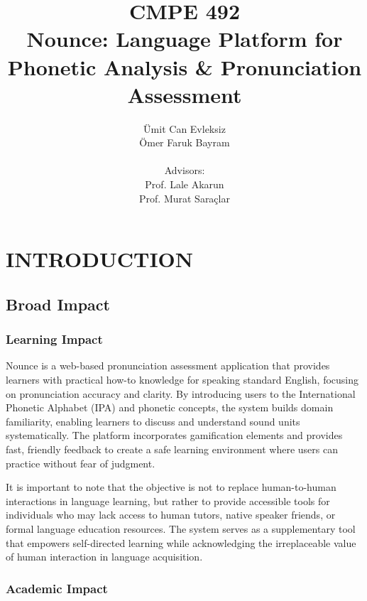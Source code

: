 \documentclass[a4paper,12pt]{report}
\begin{document}
\title{CMPE 492 \\ Nounce: Language Platform for Phonetic Analysis \& Pronunciation Assessment}
\author{
Ümit Can Evleksiz \\
Ömer Faruk Bayram \\ \\
Advisors: \\
Prof. Lale Akarun \\
Prof. Murat Saraçlar
}
\date{}
\maketitle{}
\tableofcontents

\chapter{INTRODUCTION}

\section{Broad Impact}

\subsection{Learning Impact}

Nounce is a web-based pronunciation assessment application that provides learners with practical how-to knowledge for speaking standard English, focusing on pronunciation accuracy and clarity. By introducing users to the International Phonetic Alphabet (IPA) and phonetic concepts, the system builds domain familiarity, enabling learners to discuss and understand sound units systematically. The platform incorporates gamification elements and provides fast, friendly feedback to create a safe learning environment where users can practice without fear of judgment.

It is important to note that the objective is not to replace human-to-human interactions in language learning, but rather to provide accessible tools for individuals who may lack access to human tutors, native speaker friends, or formal language education resources. The system serves as a supplementary tool that empowers self-directed learning while acknowledging the irreplaceable value of human interaction in language acquisition.

\subsection{Academic Impact}
\end{document}
